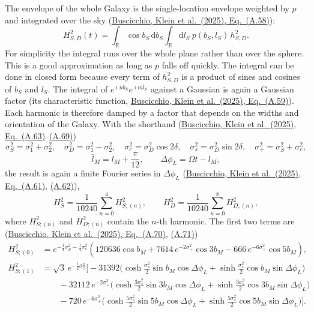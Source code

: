 \documentclass[11pt,a4paper]{article}
\newcommand{\urlPtwo}{https://arxiv.org/pdf/2410.08263}
\newcommand{\PtwoEq}[1]{\href{\urlPtwo}{Buscicchio, Klein et al.~(2025), Eq.~(#1)}}
\newcommand{\dd}{\mathrm{d}}
\begin{document}
The envelope of the whole Galaxy is the single-location envelope weighted by $p$ and
integrated over the sky (\PtwoEq{A.58}):
\begin{equation}
  H^2_{S,D}(t) = \int_{\mathbb{R}}\cos b_S\,\dd b_S\int_{\mathbb{R}}\dd l_S\
  p(b_S,l_S)\, h^2_{S,D}.
\end{equation}
For simplicity the integral runs over the whole plane rather than over the sphere.
This is a good approximation as long as $p$ falls off quickly. The integral can be
done in closed form because every term of $h^2_{S,D}$ is a product of sines and
cosines of $b_S$ and $l_S$. The integral of $e^{\imath n b_S}e^{\imath m l_S}$
against a Gaussian is again a Gaussian factor (its characteristic function,
\PtwoEq{A.59}). Each harmonic is therefore damped by a factor that depends on the
widths and orientation of the Galaxy. With the shorthand (\PtwoEq{A.63}--\href{\urlPtwo}{(A.69)})
\begin{equation}
  \sigma_S^2=\sigma_1^2+\sigma_2^2,\quad
  \sigma_D^2=\sigma_1^2-\sigma_2^2,\quad
  \sigma_c^2=\sigma_D^2\cos2\delta,\quad
  \sigma_s^2=\sigma_D^2\sin2\delta,\quad
  \sigma_+^2=\sigma_S^2+\sigma_c^2,
\end{equation}
\begin{equation}
  \bar l_M = l_M + \frac{\pi}{12},\qquad \Delta\phi_L = \Omega t - l_M,
\end{equation}
the result is again a finite Fourier series in $\Delta\phi_L$
(\PtwoEq{A.61}, \href{\urlPtwo}{(A.62)}),
\begin{equation}
  H_S^2 = \frac{1}{10240}\sum_{n=0}^{4} H^2_{S;(n)},\qquad
  H_D^2 = \frac{1}{10240}\sum_{n=0}^{8} H^2_{D;(n)},
\end{equation}
where $H^2_{S;(n)}$ and $H^2_{D;(n)}$ contain the $n$-th harmonic. The first two
terms are (\PtwoEq{A.70}, \href{\urlPtwo}{(A.71)})
\begin{align}
  H^2_{S;(0)} &= e^{-\frac14\sigma_S^2-\frac14\sigma_c^2}
  \left(120636\cos b_M + 7614\,e^{-2\sigma_+^2}\cos3b_M - 666\,e^{-6\sigma_+^2}\cos5b_M\right),\\
  H^2_{S;(1)} &= \sqrt3\,e^{-\frac12\sigma_S^2}\Big[
  -31392\Big(\cosh\tfrac{\sigma_s^2}{2}\sin b_M\cos\Delta\phi_L + \sinh\tfrac{\sigma_s^2}{2}\cos b_M\sin\Delta\phi_L\Big) \nonumber\\
  &\qquad -32112\,e^{-2\sigma_+^2}\Big(\cosh\tfrac{3\sigma_s^2}{2}\sin3b_M\cos\Delta\phi_L + \sinh\tfrac{3\sigma_s^2}{2}\cos3b_M\sin\Delta\phi_L\Big) \nonumber\\
  &\qquad -720\,e^{-6\sigma_+^2}\Big(\cosh\tfrac{5\sigma_s^2}{2}\sin5b_M\cos\Delta\phi_L + \sinh\tfrac{5\sigma_s^2}{2}\cos5b_M\sin\Delta\phi_L\Big)\Big].
\end{align}
\end{document}
